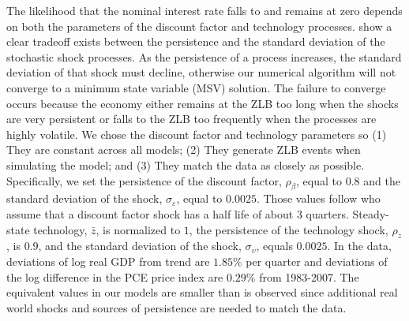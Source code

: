 \documentclass[12pt,final]{article}
\begin{document}
The likelihood that the nominal interest rate falls to and remains at zero depends on both the parameters of the discount factor and technology processes. \citet{RichterThrockmorton2015} show a clear tradeoff exists between the persistence and the standard deviation of the stochastic shock processes. As the persistence of a process increases, the standard deviation of that shock must decline, otherwise our numerical algorithm will not converge to a minimum state variable (MSV) solution. The failure to converge occurs because the economy either remains at the ZLB too long when the shocks are very persistent or falls to the ZLB too frequently when the processes are highly volatile. We chose the discount factor and technology parameters so (1) They are constant across all models; (2) They generate ZLB events when simulating the model; and (3) They match the data as closely as possible. Specifically, we set the persistence of the discount factor, $\rho_\beta$, equal to $0.8$ and the standard deviation of the shock, $\sigma_\varepsilon$, equal to $0.0025$. Those values follow \citet{FernandezVillaverdeEtAl2012} who assume that a discount factor shock has a half life of about $3$ quarters. Steady-state technology, $\bar{z}$, is normalized to $1$, the persistence of the technology shock, $\rho_z$, is $0.9$, and the standard deviation of the shock, $\sigma_\upsilon$, equals $0.0025$. In the data, deviations of log real GDP from trend are $1.85\%$ per quarter and deviations of the log difference in the PCE price index are $0.29\%$ from 1983-2007. The equivalent values in our models are smaller than is observed since additional real world shocks and sources of persistence are needed to match the data.



\end{document}
